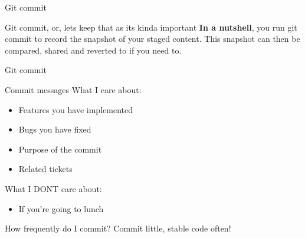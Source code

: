 \begin{frame}{Git commit}
    \begin{block}{Git commit, or, lets keep that as its kinda important}
    \textbf{In a nutshell}, you run git commit to record the snapshot of your staged content. This snapshot can then be compared, shared and reverted to if you need to.
    
    \end{block}
\end{frame}
\begin{frame}{Git commit}
    \begin{block}{Commit messages}
        What I care about:
        \begin{itemize}
            \item Features you have implemented
            \item Bugs you have fixed
            \item Purpose of the commit
            \item Related tickets
        \end{itemize}
        What I DONT care about:
        \begin{itemize}
            \item If you're going to lunch
        \end{itemize}
    \end{block}
    \begin{block}{How frequently do I commit?}
        Commit little, stable code often!
    \end{block}
    \pause
\end{frame}
